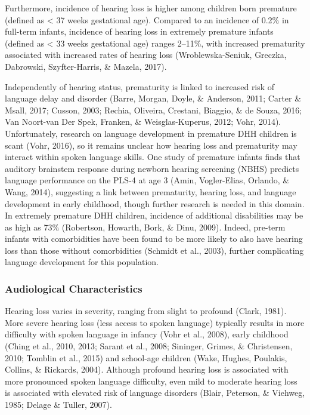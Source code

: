 \documentclass[
  english,
  man]{apa6}
\begin{document}
Furthermore, incidence of hearing loss is higher among children born premature (defined as \textless{} 37 weeks gestational age). Compared to an incidence of 0.2\% in full-term infants, incidence of hearing loss in extremely premature infants (defined as \textless{} 33 weeks gestational age) ranges 2--11\%, with increased prematurity associated with increased rates of hearing loss (Wroblewska-Seniuk, Greczka, Dabrowski, Szyfter-Harris, \& Mazela, 2017).

Independently of hearing status, prematurity is linked to increased risk of language delay and disorder (Barre, Morgan, Doyle, \& Anderson, 2011; Carter \& Msall, 2017; Cusson, 2003; Rechia, Oliveira, Crestani, Biaggio, \& de Souza, 2016; Van Noort-van Der Spek, Franken, \& Weisglas-Kuperus, 2012; Vohr, 2014). Unfortunately, research on language development in premature DHH children is scant (Vohr, 2016), so it remains unclear how hearing loss and prematurity may interact within spoken language skills. One study of premature infants finds that auditory brainstem response during newborn hearing screening (NBHS) predicts language performance on the PLS-4 at age 3 (Amin, Vogler-Elias, Orlando, \& Wang, 2014), suggesting a link between prematurity, hearing loss, and language development in early childhood, though further research is needed in this domain. In extremely premature DHH children, incidence of additional disabilities may be as high as 73\% (Robertson, Howarth, Bork, \& Dinu, 2009). Indeed, pre-term infants with comorbidities have been found to be more likely to also have hearing loss than those without comorbidities (Schmidt et al., 2003), further complicating language development for this population.

\hypertarget{audiological-characteristics}{%
\subsubsection{Audiological Characteristics}\label{audiological-characteristics}}

Hearing loss varies in severity, ranging from slight to profound (Clark, 1981). More severe hearing loss (less access to spoken language) typically results in more difficulty with spoken language in infancy (Vohr et al., 2008), early childhood (Ching et al., 2010, 2013; Sarant et al., 2008; Sininger, Grimes, \& Christensen, 2010; Tomblin et al., 2015) and school-age children (Wake, Hughes, Poulakis, Collins, \& Rickards, 2004). Although profound hearing loss is associated with more pronounced spoken language difficulty, even mild to moderate hearing loss is associated with elevated risk of language disorders (Blair, Peterson, \& Viehweg, 1985; Delage \& Tuller, 2007).
\end{document}
